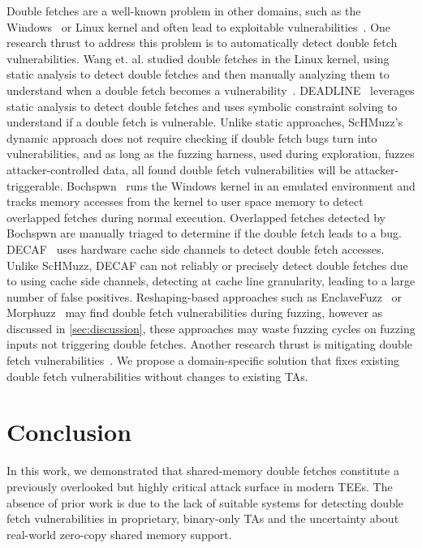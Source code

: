 \documentclass[conference]{IEEEtran}
\newcommand{\sysname}{ScHMuzz\xspace}
\begin{document}
Double fetches are a well-known problem in other domains, such as 
the Windows~\cite{ms2008} or Linux kernel\cite{wang2017double} and often lead 
to exploitable vulnerabilities~\cite{warpattack,bochspwn}.
One research thrust to address this problem is to automatically detect double 
fetch vulnerabilities. Wang et. al. studied double fetches in the Linux kernel, 
using static analysis to detect double fetches and then manually analyzing them 
to understand when a double fetch becomes a vulnerability~\cite{wang2017double}. 
DEADLINE~\cite{deadline} leverages static analysis to detect double fetches and 
uses symbolic constraint solving to understand if a double fetch is vulnerable. 
Unlike static approaches, \sysname's 
dynamic approach does not require checking if double fetch bugs turn into 
vulnerabilities, and as long as the fuzzing harness, used 
during exploration, fuzzes attacker-controlled data, all found double fetch 
vulnerabilities will be attacker-triggerable. Bochspwn~\cite{bochspwn} runs 
the Windows kernel in an emulated environment and tracks memory accesses from the 
kernel to user space memory to detect overlapped fetches during normal execution. 
Overlapped fetches detected by Bochspwn are manually triaged to determine if the double 
fetch leads to a bug. DECAF~\cite{decaf} uses hardware cache side 
channels to detect double fetch accesses. Unlike \sysname, DECAF can not reliably 
or precisely detect double fetches due to using cache side channels, detecting at 
cache line granularity, leading to a large number of false positives. 
Reshaping-based approaches such as EnclaveFuzz~\cite{chen2024enclavefuzz} or 
Morphuzz~\cite{morphuzz} may find double fetch vulnerabilities during fuzzing, however 
as discussed in \autoref{sec:discussion}, these approaches may waste fuzzing cycles on 
fuzzing inputs not triggering double fetches. 
Another research thrust is mitigating double fetch vulnerabilities~\cite{midas,safefetch,decaf,dftinker}.
We propose a domain-specific solution that fixes existing double fetch vulnerabilities 
without changes to existing TAs.

\section{Conclusion}\label{sec:conclusion}

In this work, we demonstrated that shared-memory double fetches constitute a 
previously overlooked but highly critical attack surface in modern TEEs. 
The absence of prior work is due to the lack of suitable systems for detecting double fetch 
vulnerabilities in proprietary, binary-only TAs and the uncertainty about real-world 
zero-copy shared memory support.
\end{document}
